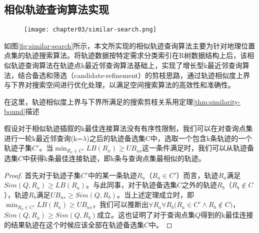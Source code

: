 \subsection{相似轨迹查询算法实现}
\label{subsec:algorithm implementation}

\begin{figure}[!htp]
  \centering
  \texttt{[image: chapter03/similar-search.png]}
\end{figure}

如图\ref{fig:similar-search}\cite{shang2014personalized}所示，本文所实现的相似轨迹查询算法主要为针对地理位置点集的轨迹搜索算法\cite{qi2015efficient}。将轨迹数据按特定需求分类索引在R树数据结构上后，该相似轨迹查询算法在轨迹点k最近邻查询算法\cite{roussopoulos1995nearest}基础上，实现了增长型k最近邻查询算法\cite{chen2010searching}，结合备选和筛选（candidate-refinement）的剪枝思路\cite{tang2011retrieving}，通过轨迹相似度上界与下界对搜索空间进行优化处理，以满足空间搜索算法的高效性和准确性。

在这里，轨迹相似度上界与下界所满足的搜索剪枝关系用定理\ref{thm:similarity-bound}描述

\begin{thm}[相似度上下界]
	\label{thm:similarity-bound}
	假设对于相似轨迹插叙的k最佳连接算法没有有序性限制，我们可以在对查询点集进行一轮k最近邻查询(k=$\lambda$)之后的轨迹备选集C中，选取一个包含k条轨迹的一个轨迹子集$C'$。当$\min_{R_{x}\in C'}{LB(R_{x})}\geq UB_{us}$这一条件满足时，我们可以从轨迹备选集$C$中获得k条最佳连接轨迹，即k条与查询点集最相似的轨迹。
	\begin{proof}
	首先对于轨迹子集$C'$中的某一条轨迹$R_{a}$（$R_{a} \in C'$）而言，轨迹$R_{a}$满足$Sim(Q,R_{a}) \geq LB(R_{a})$。与此同事，对于轨迹备选集$C$之外的轨迹$R_{b}$（$R_{b} \notin C$），轨迹$R_{b}$满足$UB_{ns} \geq Sim(Q,R_{b})$。当上述定理成立时，即$\min_{R_{a}\in C'}{LB(R_{a})}\geq UB_{ns}$，我们可以推断出$\forall R_{a}\forall R_{b} \big( R_{a} \in C' \wedge R_{b} \notin C \big)$，$Sim(Q,R_{a}) \geq Sim(Q,R_{b})$成立。这也证明了对于查询点集$Q$得到的k最佳连接的结果轨迹在这个时候应该全部在轨迹备选集$C$中。
	\end{proof}
\end{thm}

